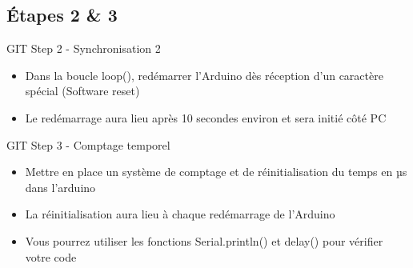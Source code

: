 \documentclass[a4paper,11pt]{beamer}
\begin{document}
\subsection{Étapes 2 \& 3}
\begin{frame}
\begin{exampleblock}{GIT Step 2 - Synchronisation 2}
\begin{itemize}
\item Dans la boucle loop(), redémarrer l'Arduino dès réception d'un caractère spécial (Software reset)
\item Le redémarrage aura lieu après 10 secondes environ et sera initié côté PC
\end{itemize}
\end{exampleblock}
\begin{exampleblock}{GIT Step 3 - Comptage temporel}
\begin{itemize}
\item Mettre en place un système de comptage et de réinitialisation du temps en µs dans l'arduino
\item La réinitialisation aura lieu à chaque redémarrage de l'Arduino
\item Vous pourrez utiliser les fonctions Serial.println() et delay() pour vérifier votre code
\end{itemize}
\end{exampleblock}
\end{frame}
\end{document}
